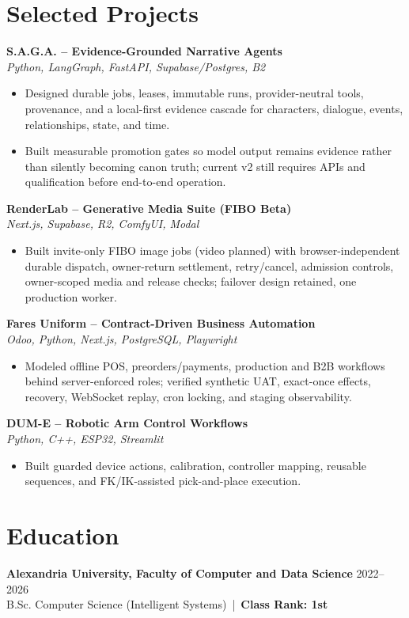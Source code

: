 \documentclass[letterpaper]{article}
\newcommand{\projectheader}[2]{\textbf{#1} \\\textit{#2} \\}
\begin{document}
\section*{Selected Projects}
\projectheader{S.A.G.A. -- Evidence-Grounded Narrative Agents}{Python, LangGraph, FastAPI, Supabase/Postgres, B2}
\begin{itemize}
\item Designed durable jobs, leases, immutable runs, provider-neutral tools, provenance, and a local-first evidence cascade for characters, dialogue, events, relationships, state, and time.
\item Built measurable promotion gates so model output remains evidence rather than silently becoming canon truth; current v2 still requires APIs and qualification before end-to-end operation.
\end{itemize}
\projectheader{RenderLab -- Generative Media Suite (FIBO Beta)}{Next.js, Supabase, R2, ComfyUI, Modal}
\begin{itemize}
\item Built invite-only FIBO image jobs (video planned) with browser-independent durable dispatch, owner-return settlement, retry/cancel, admission controls, owner-scoped media and release checks; failover design retained, one production worker.
\end{itemize}
\projectheader{Fares Uniform -- Contract-Driven Business Automation}{Odoo, Python, Next.js, PostgreSQL, Playwright}
\begin{itemize}
\item Modeled offline POS, preorders/payments, production and B2B workflows behind server-enforced roles; verified synthetic UAT, exact-once effects, recovery, WebSocket replay, cron locking, and staging observability.
\end{itemize}
\projectheader{DUM-E -- Robotic Arm Control Workflows}{Python, C++, ESP32, Streamlit}
\begin{itemize}
\item Built guarded device actions, calibration, controller mapping, reusable sequences, and FK/IK-assisted pick-and-place execution.
\end{itemize}

\section*{Education}
\textbf{Alexandria University, Faculty of Computer and Data Science} \hfill 2022--2026\\
B.Sc. Computer Science (Intelligent Systems) \,|\, \textbf{Class Rank: 1st}
\end{document}
